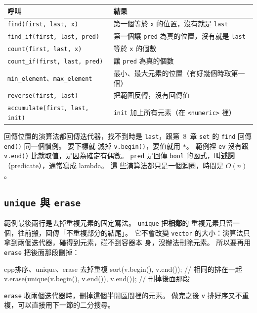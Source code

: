 \begin{center}
\begin{tabular}{ll}
\toprule
呼叫 & 結果 \\
\midrule
\texttt{find(first, last, x)} & 第一個等於 \texttt{x} 的位置，沒有就是 \texttt{last} \\
\texttt{find\_if(first, last, pred)} & 第一個讓 \texttt{pred} 為真的位置，沒有就是 \texttt{last} \\
\texttt{count(first, last, x)} & 等於 \texttt{x} 的個數 \\
\texttt{count\_if(first, last, pred)} & 讓 \texttt{pred} 為真的個數 \\
\texttt{min\_element}、\texttt{max\_element} & 最小、最大元素的位置（有好幾個時取第一個） \\
\texttt{reverse(first, last)} & 把範圍反轉，沒有回傳值 \\
\texttt{accumulate(first, last, init)} & \texttt{init} 加上所有元素（在 \texttt{<numeric>} 裡） \\
\bottomrule
\end{tabular}
\end{center}

回傳位置的演算法都回傳迭代器，找不到時是 \texttt{last}，跟第~8~章
\texttt{set} 的 \texttt{find} 回傳 \texttt{end()} 同一個慣例。 要下標就
減掉 \texttt{v.begin()}，要值就用 \texttt{*}。 範例裡 \texttt{ev} 沒有跟
\texttt{v.end()} 比就取值，是因為確定有偶數。 \texttt{pred} 是回傳
\texttt{bool} 的函式，叫\textbf{述詞}（predicate），通常寫成 lambda。 這
些演算法都只是一個迴圈，時間是 $O(n)$。

\subsection{\texttt{unique} 與 \texttt{erase}}

範例最後兩行是去掉重複元素的固定寫法。 \texttt{unique} 把\textbf{相鄰}的
重複元素只留一個，往前搬，回傳「不重複部分的結尾」。 它不會改變
\texttt{vector} 的大小：演算法只拿到兩個迭代器，碰得到元素，碰不到容器本
身，沒辦法刪除元素。 所以要再用 \texttt{erase} 把後面那段刪掉：

\begin{code}{cpp}{排序、unique、erase 去掉重複}
sort(v.begin(), v.end());                       // 相同的排在一起
v.erase(unique(v.begin(), v.end()), v.end());   // 刪掉後面那段
\end{code}

\texttt{erase} 收兩個迭代器時，刪掉這個半開區間裡的元素。 做完之後
\texttt{v} 排好序又不重複，可以直接用下一節的二分搜尋。

